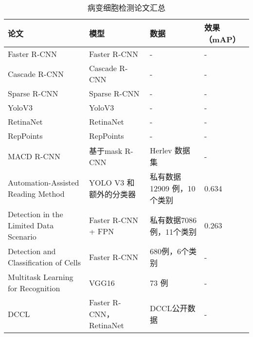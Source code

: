 \begin{table}[htbp]
    \center
    \caption{病变细胞检测论文汇总}
    \begin{tabular}{|p{4cm}|p{4cm}|p{3cm}|p{1cm}|}
        \hline
        论文                                                             & 模型                    & 数据                       & 效果（mAP） \\     \hline
        Faster R-CNN\cite{ren2015faster}                                 & Faster R-CNN            & -                          & -           \\ \hline
        Cascade R-CNN\cite{cai2017cascade}                               & Cascade R-CNN           & -                          & -           \\ \hline
        Sparse R-CNN\cite{sun2021sparse}                                 & Sparse R-CNN            & -                          & -           \\ \hline
        YoloV3\cite{Joseph2018YOLOv3}                                    & YoloV3                  & -                          & -           \\ \hline
        RetinaNet\cite{lin2018focal}                                     & RetinaNet               & -                          & -           \\ \hline
        RepPoints\cite{yang2019reppoints}                                & RepPoints               & -                          & -           \\ \hline
        MACD R-CNN\cite{ma2020macd}                                      & 基于mask R-CNN          & Herlev 数据集              & -           \\ \hline
        Automation-Assisted Reading Method\cite{xiang2020novel}          & YOLO V3 和额外的分类器  & 私有数据12909 例，10个类别 & 0.634       \\ \hline
        Detection in the Limited Data Scenario\cite{liang2018comparison} & Faster R-CNN + FPN      & 私有数据7086例，11个类别   & 0.263       \\ \hline
        Detection and Classification of Cells\cite{li2019detection}      & Faster R-CNN            & 680例，6个类别             & -           \\ \hline
        Multitask Learning for Recognition\cite{liu2018multitask}        & VGG16                   & 73 例                      & -           \\ \hline
        DCCL\cite{zhang2019dccl}                                         & Faster R-CNN，RetinaNet & DCCL公开数据               & -           \\ \hline
    \end{tabular}
    \label{tab:检测论文}
\end{table}
